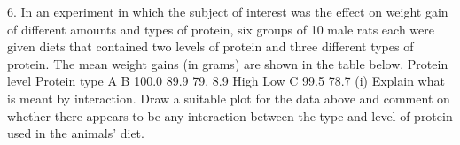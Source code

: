 \documentclass[a4paper,12pt]{article}
\begin{document}
\large 
\begin{framed}
6.
In an experiment in which the subject of interest was the effect on weight gain of
different amounts and types of protein, six groups of 10 male rats each were given
diets that contained two levels of protein and three different types of protein. The
mean weight gains (in grams) are shown in the table below.
Protein level
Protein type
A
B
100.0
89.9
79.
8.9
High
Low
C
99.5
78.7
(i) Explain what is meant by interaction. Draw a suitable plot for the data above
and comment on whether there appears to be any interaction between the type
and level of protein used in the animals' diet.

\end{framed}
\end{document}
